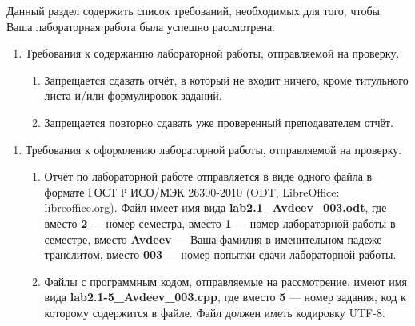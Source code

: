Данный раздел содержить список требований, необходимых для того, чтобы Ваша лабораторная работа была успешно рассмотрена.

\begin{enumerate}
	\item
		Требования к содержанию лабораторной работы, отправляемой на проверку.
	\begin{enumerate}
		\item
			Запрещается сдавать отчёт, в который не входит ничего, кроме титульного листа и/или формулировок заданий.
		\item
			Запрещается повторно сдавать уже проверенный преподавателем отчёт.
	\end{enumerate}

\end{enumerate}

\begin{enumerate}
	\item
		Требования к оформлению лабораторной работы, отправляемой на проверку.
	\begin{enumerate}
		\item
			Отчёт по лабораторной работе отправляется в виде одного файла в формате ГОСТ Р ИСО/МЭК 26300-2010 (ODT, LibreOffice: libreoffice.org).
			Файл имеет имя вида \textbf{lab2.1\_Avdeev\_003.odt},
			где вместо \textbf{2} --- номер семестра, вместо \textbf{1} --- номер лабораторной работы в семестре,
			вместо \textbf{Avdeev} --- Ваша фамилия в именительном падеже транслитом,
			вместо \textbf{003} --- номер попытки сдачи лабораторной работы.
		\item
			Файлы с программным кодом, отправляемые на рассмотрение, имеют имя вида \textbf{lab2.1-5\_Avdeev\_003.cpp},
			где вместо \textbf{5} --- номер задания, код к которому содержится в файле.
			Файл должен иметь кодировку UTF-8.
	\end{enumerate}

\end{enumerate}


